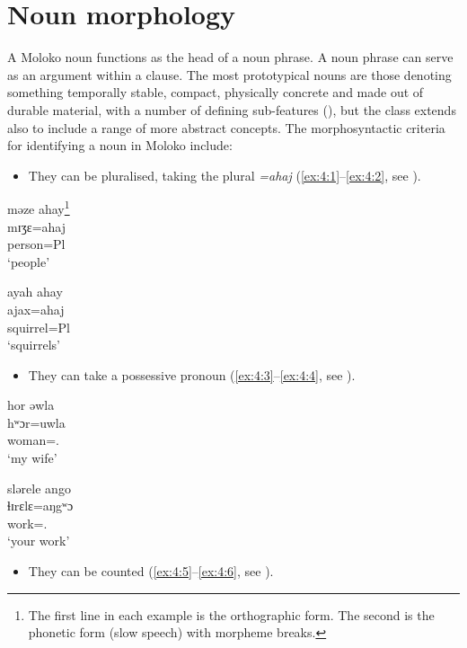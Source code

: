 \chapter[Noun morphology]{Noun morphology}\label{chap:4}
\hypertarget{RefHeading1211341525720847}{}
A Moloko noun functions as the head of a noun phrase. A noun phrase can serve as an argument within a clause.  The most prototypical nouns are those denoting something temporally stable, compact, physically concrete and made out of durable material, with a number of defining sub-features (\citealt[50--51]{Givon2001}), but the class extends also to include a range of more abstract concepts. The morphosyntactic criteria for identifying a noun in Moloko include: 

\begin{itemize}
\item They can be pluralised, taking the plural \textit{=ahaj} (\ref{ex:4:1}--\ref{ex:4:2}, see ).
\end{itemize}

\ea \label{ex:4:1}
məze  ahay\footnote{The first line in each example is the orthographic form. The second is the phonetic form (slow speech) with morpheme breaks.}\\
\gll  mɪʒɛ=ahaj\\
      person=Pl\\
\glt  ‘people’
\z

\ea \label{ex:4:2}
ayah  ahay\\
\gll  ajax=ahaj\\
      squirrel=Pl\\
\glt  ‘squirrels’
\z

\begin{itemize}
\item They can take a possessive pronoun (\ref{ex:4:3}--\ref{ex:4:4}, see ).
\end{itemize}

\ea \label{ex:4:3}
hor  əwla\\
\gll  hʷɔr=uwla\\
      woman={\oneS}.{\POSS}\\
\glt  ‘my wife’
\z

\ea \label{ex:4:4}
slərele  ango\\
\gll  ɬɪrɛlɛ=aŋgʷɔ\\
      work={\twoS}.{\POSS}\\
\glt  ‘your work’
\z

\begin{itemize}
\item They can be counted (\ref{ex:4:5}--\ref{ex:4:6}, see ).
\end{itemize}

